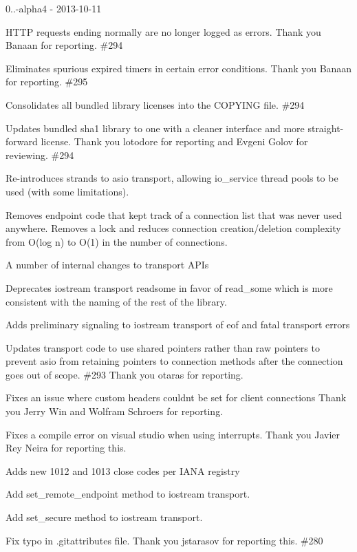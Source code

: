 0..-\/alpha4 -\/ 2013-\/10-\/11
\begin{DoxyItemize}
\item H\+T\+TP requests ending normally are no longer logged as errors. Thank you Banaan for reporting. \#294
\item Eliminates spurious expired timers in certain error conditions. Thank you Banaan for reporting. \#295
\item Consolidates all bundled library licenses into the C\+O\+P\+Y\+I\+NG file. \#294
\item Updates bundled sha1 library to one with a cleaner interface and more straight-\/forward license. Thank you lotodore for reporting and Evgeni Golov for reviewing. \#294
\item Re-\/introduces strands to asio transport, allowing {\ttfamily io\+\_\+service} thread pools to be used (with some limitations).
\item Removes endpoint code that kept track of a connection list that was never used anywhere. Removes a lock and reduces connection creation/deletion complexity from O(log n) to O(1) in the number of connections.
\item A number of internal changes to transport A\+P\+Is
\item Deprecates iostream transport {\ttfamily readsome} in favor of {\ttfamily read\+\_\+some} which is more consistent with the naming of the rest of the library.
\item Adds preliminary signaling to iostream transport of eof and fatal transport errors
\item Updates transport code to use shared pointers rather than raw pointers to prevent asio from retaining pointers to connection methods after the connection goes out of scope. \#293 Thank you otaras for reporting.
\item Fixes an issue where custom headers couldn\textquotesingle{}t be set for client connections Thank you Jerry Win and Wolfram Schroers for reporting.
\item Fixes a compile error on visual studio when using interrupts. Thank you Javier Rey Neira for reporting this.
\item Adds new 1012 and 1013 close codes per I\+A\+NA registry
\item Add {\ttfamily set\+\_\+remote\+\_\+endpoint} method to iostream transport.
\item Add {\ttfamily set\+\_\+secure} method to iostream transport.
\item Fix typo in .gitattributes file. Thank you jstarasov for reporting this. \#280

\end{DoxyItemize}
